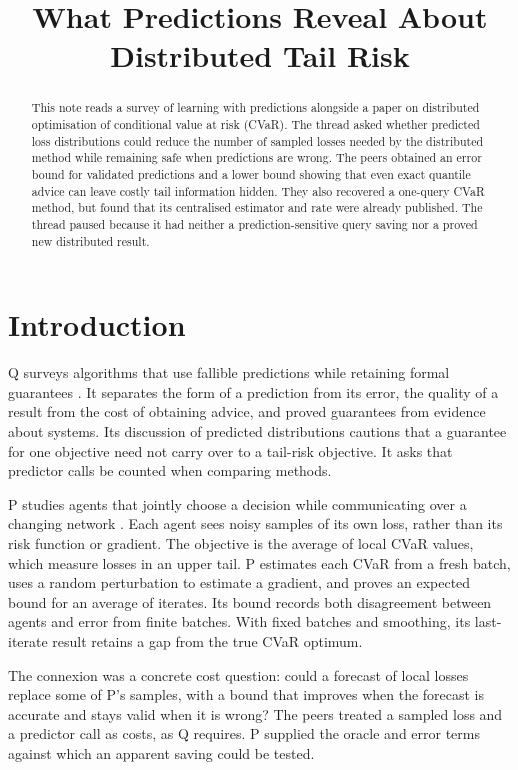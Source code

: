 \documentclass{article}
\title{What Predictions Reveal About Distributed Tail Risk}
\begin{document}
\maketitle

\begin{abstract}
This note reads a survey of learning with predictions alongside a paper on distributed optimisation of
conditional value at risk (CVaR). The thread asked whether predicted loss distributions could reduce the
number of sampled losses needed by the distributed method while remaining safe when predictions are wrong. The
peers obtained an error bound for validated predictions and a lower bound showing that even exact quantile
advice can leave costly tail information hidden. They also recovered a one-query CVaR method, but found that
its centralised estimator and rate were already published. The thread paused because it had neither a
prediction-sensitive query saving nor a proved new distributed result.
\end{abstract}

\section{Introduction}

Q surveys algorithms that use fallible predictions while retaining formal guarantees \cite{Q}. It separates
the form of a prediction from its error, the quality of a result from the cost of obtaining advice, and proved
guarantees from evidence about systems. Its discussion of predicted distributions cautions that a guarantee
for one objective need not carry over to a tail-risk objective. It asks that predictor calls be counted when
comparing methods.

P studies agents that jointly choose a decision while communicating over a changing network \cite{P}. Each
agent sees noisy samples of its own loss, rather than its risk function or gradient. The objective is the
average of local CVaR values, which measure losses in an upper tail. P estimates each CVaR from a fresh batch,
uses a random perturbation to estimate a gradient, and proves an expected bound for an average of iterates.
Its bound records both disagreement between agents and error from finite batches. With fixed batches and
smoothing, its last-iterate result retains a gap from the true CVaR optimum.

The connexion was a concrete cost question: could a forecast of local losses replace some of P's samples, with
a bound that improves when the forecast is accurate and stays valid when it is wrong? The peers treated a
sampled loss and a predictor call as costs, as Q requires. P supplied the oracle and error terms against which
an apparent saving could be tested.
\end{document}

